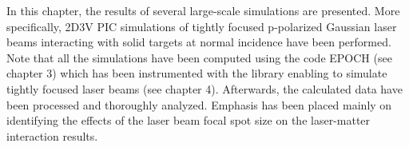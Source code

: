 In this chapter, the results of several large-scale simulations are presented. More specifically, 2D3V PIC simulations of tightly focused p-polarized Gaussian laser beams interacting with solid targets at normal incidence have been performed. Note that all the simulations have been computed using the code EPOCH (see chapter 3) which has been instrumented with the library enabling to simulate tightly focused laser beams (see chapter 4). Afterwards, the calculated data have been processed and thoroughly analyzed. Emphasis has been placed mainly on identifying the effects of the laser beam focal spot size on the laser-matter interaction results.